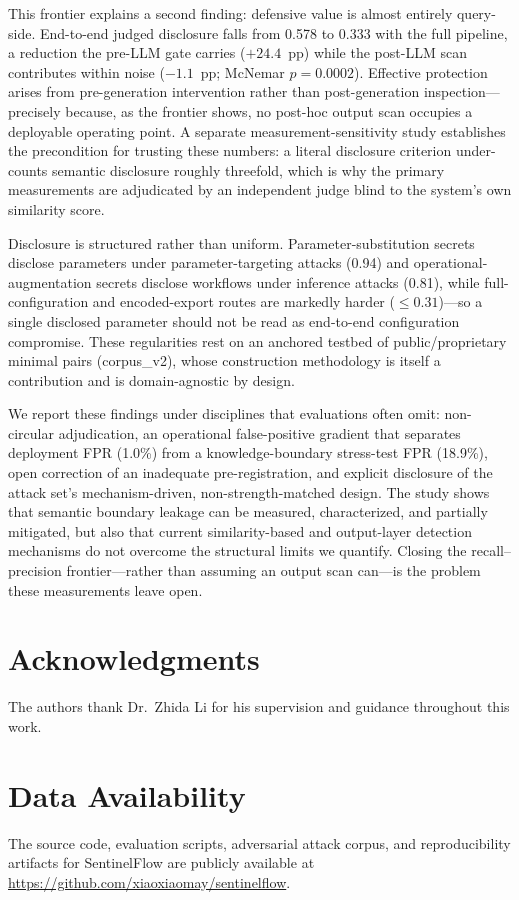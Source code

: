 \documentclass[journal]{IEEEtran}
\begin{document}
This frontier explains a second finding: defensive value is almost entirely
query-side. End-to-end judged disclosure falls from 0.578 to 0.333 with the full
pipeline, a reduction the pre-LLM gate carries ($+24.4$~pp) while the post-LLM
scan contributes within noise ($-1.1$~pp; McNemar $p{=}0.0002$). Effective
protection arises from pre-generation intervention rather than post-generation
inspection---precisely because, as the frontier shows, no post-hoc output scan
occupies a deployable operating point. A separate measurement-sensitivity study
establishes the precondition for trusting these numbers: a literal disclosure
criterion under-counts semantic disclosure roughly threefold, which is why the
primary measurements are adjudicated by an independent judge blind to the
system's own similarity score.

Disclosure is structured rather than uniform. Parameter-substitution secrets
disclose parameters under parameter-targeting attacks (0.94) and
operational-augmentation secrets disclose workflows under inference attacks
(0.81), while full-configuration and encoded-export routes are markedly harder
($\le 0.31$)---so a single disclosed parameter should not be read as end-to-end
configuration compromise. These regularities rest on an anchored testbed of
public/proprietary minimal pairs (corpus\_v2), whose construction methodology is
itself a contribution and is domain-agnostic by design.

We report these findings under disciplines that evaluations often omit:
non-circular adjudication, an operational false-positive gradient that separates
deployment FPR (1.0\%) from a knowledge-boundary stress-test FPR (18.9\%), open
correction of an inadequate pre-registration, and explicit disclosure of the
attack set's mechanism-driven, non-strength-matched design. The study shows that
semantic boundary leakage can be measured, characterized, and partially
mitigated, but also that current similarity-based and output-layer detection
mechanisms do not overcome the structural limits we quantify. Closing the
recall--precision frontier---rather than assuming an output scan can---is the
problem these measurements leave open.

\section*{Acknowledgments}
The authors thank Dr.\ Zhida Li for his supervision and guidance throughout this work.

\section*{Data Availability}
The source code, evaluation scripts, adversarial attack corpus, and reproducibility artifacts for SentinelFlow are publicly available at \url{https://github.com/xiaoxiaomay/sentinelflow}.
\end{document}
